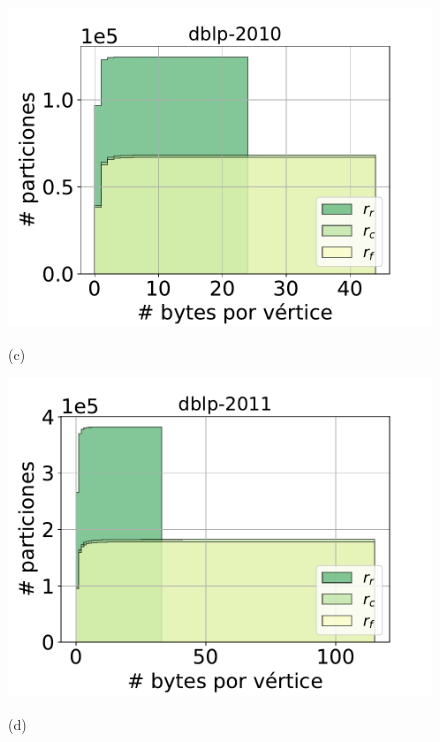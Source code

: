 \begin{figure}
    	\begin{minipage}{1\textwidth}
    		\centering
    		\begin{minipage}{0.45\textwidth}
    			\centering
    			\includegraphics[width=1\linewidth]{img/cdf/dblp-2010.pdf}
    			
    			(c)
    		\end{minipage}
    		\begin{minipage}{0.45\textwidth}
    			\centering
    			\includegraphics[width=1\linewidth]{img/cdf/dblp-2011.pdf}
    			
    			(d)
    		\end{minipage}  
    	\end{minipage}
    	

\end{figure}
